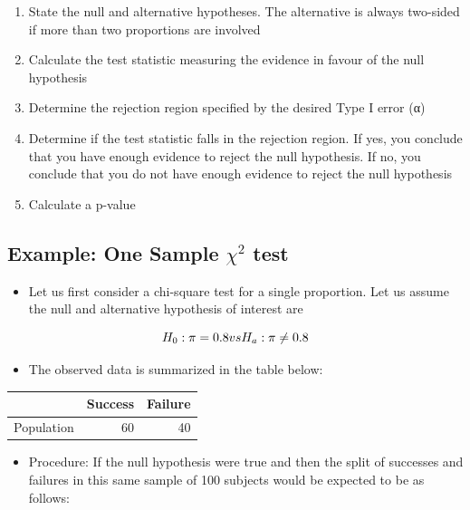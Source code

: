 \documentclass[
]{book}
\providecommand{\tightlist}{%
  \setlength{\itemsep}{0pt}\setlength{\parskip}{0pt}}
\begin{document}
\begin{enumerate}
\def\labelenumi{\arabic{enumi}.}
\tightlist
\item
  State the null and alternative hypotheses. The alternative is always two-sided if more than two proportions are involved
\item
  Calculate the test statistic measuring the evidence in favour of the null hypothesis
\item
  Determine the rejection region specified by the desired Type I error (α)
\item
  Determine if the test statistic falls in the rejection region. If yes, you conclude that you have enough evidence to reject the null hypothesis. If no, you conclude that you do not have enough evidence to reject the null hypothesis
\item
  Calculate a p-value
\end{enumerate}

\hypertarget{example-one-sample-chi2-test}{%
\subsection{\texorpdfstring{Example: One Sample \(\chi^2\) test}{Example: One Sample \textbackslash chi\^{}2 test}}\label{example-one-sample-chi2-test}}

\begin{itemize}
\tightlist
\item
  Let us first consider a chi-square test for a single proportion. Let us assume the null and alternative hypothesis of interest are
\end{itemize}

\[H_0:\pi=0.8\space vs\space H_a:\pi\neq0.8\]

\begin{itemize}
\tightlist
\item
  The observed data is summarized in the table below:
\end{itemize}

\begin{tabular}{l|r|r}
\hline
  &  Success &  Failure\\
\hline
Population & 60 & 40\\
\hline
\end{tabular}

\begin{itemize}
\tightlist
\item
  Procedure: If the null hypothesis were true and then the split of successes and failures in this same sample of 100 subjects would be expected to be as follows:
\end{itemize}
\end{document}
